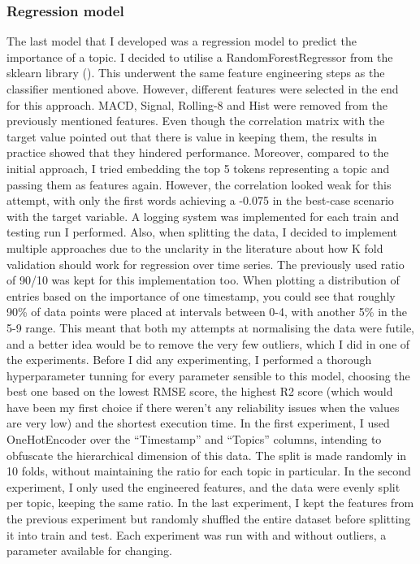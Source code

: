\documentclass[12pt,MSc,a4paper,oneside]{muthesis}
\begin{document}
\subsubsection{Regression model}
The last model that I developed was a regression model to predict the importance of a topic. I decided to utilise a RandomForestRegressor from the sklearn library (\cite{scikit-learn}). This underwent the same feature engineering steps as the classifier mentioned above.  However, different features were selected in the end for this approach. MACD, Signal, Rolling-8 and Hist were removed from the previously mentioned features. Even though the correlation matrix with the target value pointed out that there is value in keeping them, the results in practice showed that they hindered performance.
Moreover, compared to the initial approach, I tried embedding the top 5 tokens representing a topic and passing them as features again. However, the correlation looked weak for this attempt, with only the first words achieving a -0.075 in the best-case scenario with the target variable. A logging system was implemented for each train and testing run I performed. Also, when splitting the data, I decided to implement multiple approaches due to the unclarity in the literature about how K fold validation should work for regression over time series. The previously used ratio of 90/10 was kept for this implementation too. When plotting a distribution of entries based on the importance of one timestamp, you could see that roughly 90\% of data points were placed at intervals between 0-4, with another 5\% in the 5-9 range. This meant that both my attempts at normalising the data were futile, and a better idea would be to remove the very few outliers, which I did in one of the experiments.
Before I did any experimenting, I performed a thorough hyperparameter tunning for every parameter sensible to this model, choosing the best one based on the lowest RMSE score, the highest R2 score (which would have been my first choice if there weren’t any reliability issues when the values are very low) and the shortest execution time. 
In the first experiment, I used OneHotEncoder over the “Timestamp” and “Topics” columns, intending to obfuscate the hierarchical dimension of this data. The split is made randomly in 10 folds, without maintaining the ratio for each topic in particular.
In the second experiment, I only used the engineered features, and the data were evenly split per topic, keeping the same ratio.
In the last experiment, I kept the features from the previous experiment but randomly shuffled the entire dataset before splitting it into train and test.
Each experiment was run with and without outliers, a parameter available for changing.
\end{document}
